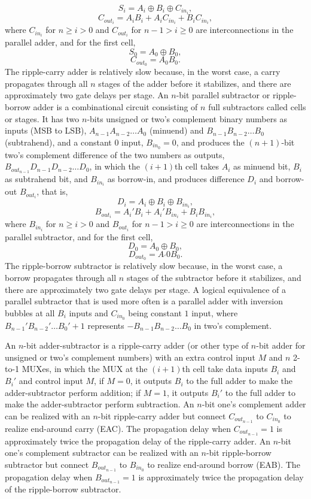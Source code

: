 \documentclass[a4paper,12pt]{article}
\begin{document}
\begin{itemize}
\begin{itemize}
\begin{itemize}
\begin{itemize}
\begin{itemize}
\begin{itemize}
\begin{itemize}
\[S_i=A_i\oplus B_i\oplus C_{in_i},\]
\[C_{out_i}=A_iB_i+A_iC_{in_i}+B_iC_{in_i},\]
where $C_{in_i}$ for $n\geq i>0$ and $C_{out_i}$ for $n-1>i\geq 0$ are interconnections in the parallel adder, and for the first cell,
\[S_0=A_0\oplus B_0,\]
\[C_{out_0}=A_0B_0.\]
The ripple-carry adder is relatively slow because, in the worst case, a carry propagates through all $n$ stages of the adder before it stabilizes, and there are approximately two gate delays per stage.
An $n$-bit parallel subtractor or ripple-borrow adder is a combinational circuit consisting of $n$ full subtractors called cells or stages. It has two $n$-bits unsigned or two's complement binary numbers as inputs (MSB to LSB), $A_{n-1}A_{n-2}\ldots A_0$ (minuend) and $B_{n-1}B_{n-2}\ldots B_0$ (subtrahend), and a constant $0$ input, $B_{in_0}=0$, and produces the $(n+1)$-bit two's complement difference of the two numbers as outputs, $B_{out_{n-1}}D_{n-1}D_{n-2}\ldots D_0$, in which the $(i+1)$th cell takes $A_i$ as minuend bit, $B_i$ as subtrahend bit, and $B_{in_i}$ as borrow-in, and produces difference $D_i$ and borrow-out $B_{out_i}$, that is,
\[D_i=A_i\oplus B_i\oplus B_{in_i},\]
\[B_{out_i}=A_i'B_i+A_i'B_{in_i}+B_iB_{in_i},\]
where $B_{in_i}$ for $n\geq i>0$ and $B_{out_i}$ for $n-1>i\geq 0$ are interconnections in the parallel subtractor, and for the first cell,
\[D_0=A_0\oplus B_0,\]
\[D_{out_0}=A_'0B_0.\]
The ripple-borrow subtractor is relatively slow because, in the worst case, a borrow propagates through all $n$ stages of the subtractor before it stabilizes, and there are approximately two gate delays per stage.
A logical equivalence of a parallel subtractor that is used more often is a parallel adder with inversion bubbles at all $B_i$ inputs and $C_{in_0}$ being constant $1$ input, where $B_{n-1}'B_{n-2}'\ldots B_0'+1$ represents $-B_{n-1}B_{n-2}\ldots B_0$ in two's complement.

An $n$-bit adder-subtractor is a ripple-carry adder (or other type of $n$-bit adder for unsigned or two's complement numbers) with an extra control input $M$ and $n$ 2-to-1 MUXes, in which the MUX at the $(i+1)$th cell take data inputs $B_i$ and $B_i'$ and control input $M$, if $M=0$, it outputs $B_i$ to the full adder to make the adder-subtractor perform addition; if $M=1$, it outputs $B_i'$ to the full adder to make the adder-subtractor perform subtraction.
An $n$-bit one's complement adder can be realized with an $n$-bit ripple-carry adder but connect $C_{out_{n-1}}$ to $C_{in_0}$ to realize end-around carry (EAC). The propagation delay when $C_{out_{n-1}}=1$ is approximately twice the propagation delay of the ripple-carry adder.
An $n$-bit one's complement subtractor can be realized with an $n$-bit ripple-borrow subtractor but connect $B_{out_{n-1}}$ to $B_{in_0}$ to realize end-around borrow (EAB). The propagation delay when $B_{out_{n-1}}=1$ is approximately twice the propagation delay of the ripple-borrow subtractor.


\end{itemize}
\end{itemize}
\end{itemize}
\end{itemize}
\end{itemize}
\end{itemize}
\end{itemize}
\end{document}
